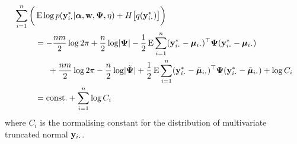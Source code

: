 \begin{align*}
  \sum_{i=1}^n  \bigg( &
  \E  \log p(\by_{i \bigcdot}^*|\balpha,\bw,\bPsi,\eta) 
  + H \big[q(\by^*_{i \bigcdot}) \big] 
  \bigg) \\
  &=  -\half[nm]\log 2\pi + \half[n] \log \abs{\bPsi} - \half \E \sum_{i=1}^n (\by^*_{i \bigcdot} - \bmu_{i \bigcdot})^\top \bPsi (\by^*_{i \bigcdot} - \bmu_{i \bigcdot}) \\
  &\phantom{==} +\half[nm]\log 2\pi - \half[n] \log \abs{\tilde\bPsi} + \half \E \sum_{i=1}^n (\by^*_{i \bigcdot} - \tilde\bmu_{i \bigcdot})^\top \bPsi (\by^*_{i \bigcdot} - \tilde\bmu_{i \bigcdot}) + \log C_i  \\
   &=\const + \sum_{i=1}^n \log C_i 
\end{align*}
where $C_i$ is the normalising constant for the distribution of multivariate truncated normal $\by_{i \bigcdot}$.

